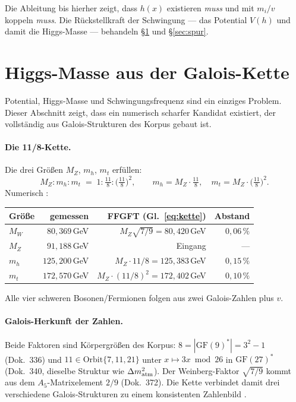 Die Ableitung bis hierher zeigt, dass $h(x)$ existieren \emph{muss} und
mit $m_i/v$ koppeln \emph{muss}. Die Rückstellkraft der Schwingung --- das
Potential $V(h)$ und damit die Higgs-Masse --- behandeln §\ref{sec:higgsmasse}
und §\ref{sec:spur}.

\section{Higgs-Masse aus der Galois-Kette \KM}
\label{sec:higgsmasse}

Potential, Higgs-Masse und Schwingungsfrequenz sind ein einziges Problem.
Dieser Abschnitt zeigt,
dass ein numerisch scharfer Kandidat existiert, der vollständig aus
Galois-Strukturen des Korpus gebaut ist.

\paragraph{Die 11/8-Kette.}
Die drei Größen $M_Z$, $m_h$, $m_t$ erfüllen:
\begin{equation}
  M_Z : m_h : m_t \;=\; 1 : \tfrac{11}{8} : \bigl(\tfrac{11}{8}\bigr)^2,
  \qquad
  m_h = M_Z\cdot\tfrac{11}{8}, \quad m_t = M_Z\cdot\bigl(\tfrac{11}{8}\bigr)^2.
  \label{eq:kette}
\end{equation}
Numerisch \KM:
\begin{center}
\small\begin{tabular}{@{}lrrr@{}}
\toprule
Größe & gemessen & FFGFT (Gl.~\eqref{eq:kette}) & Abstand \\
\midrule
$M_W$ & $80{,}369$\,GeV & $M_Z\sqrt{7/9} = 80{,}420$\,GeV & $0{,}06\,\%$ \\
$M_Z$ & $91{,}188$\,GeV & Eingang & --- \\
$m_h$ & $125{,}200$\,GeV & $M_Z\cdot11/8 = 125{,}383$\,GeV & $0{,}15\,\%$ \\
$m_t$ & $172{,}570$\,GeV & $M_Z\cdot(11/8)^2 = 172{,}402$\,GeV & $0{,}10\,\%$ \\
\bottomrule
\end{tabular}
\end{center}
Alle vier schweren Bosonen/Fermionen folgen aus zwei Galois-Zahlen plus $v$.

\paragraph{Galois-Herkunft der Zahlen.}
Beide Faktoren sind Körpergrößen des Korpus:
$8 = |\mathrm{GF}(9)^*| = 3^2 - 1$ (Dok.~336) und
$11 \in \text{Orbit}\{7,11,21\}$ unter $x\mapsto 3x \bmod 26$
in $\mathrm{GF}(27)^*$ (Dok.~340, dieselbe Struktur wie $\Delta m^2_{\rm atm}$).
Der Weinberg-Faktor $\sqrt{7/9}$ kommt aus dem $A_5$-Matrixelement $2/9$
(Dok.~372). Die Kette verbindet damit drei verschiedene Galois-Strukturen
zu einem konsistenten Zahlenbild \KM.

